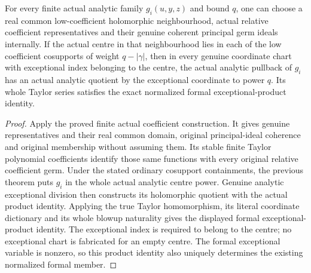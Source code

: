 \begin{theorem}
\label{hir:actual-finite-coefficient-centre-analytic-exceptional-quotients}
\leanok
For every finite actual analytic family $g_i(u,y,z)$ and bound $q$, one
can choose a real common low-coefficient holomorphic neighbourhood, actual
relative coefficient representatives and their genuine coherent principal
germ ideals internally. If the actual centre in that neighbourhood lies
in each of the low coefficient cosupports of weight $q-|\gamma|$, then
in every genuine coordinate chart with exceptional index belonging to
the centre, the actual analytic pullback of $g_i$ has an actual analytic
quotient by the exceptional coordinate to power $q$. Its whole Taylor
series satisfies the exact normalized formal exceptional-product identity.
\end{theorem}
\begin{proof}
Apply the proved finite actual coefficient construction. It gives genuine
representatives and their real common domain, original principal-ideal
coherence and original membership without assuming them. Its stable finite
Taylor polynomial coefficients identify those same functions with every
original relative coefficient germ. Under the stated ordinary cosupport
containments, the previous theorem puts $g_i$ in the whole actual analytic
centre power. Genuine analytic exceptional division then constructs its
holomorphic quotient with the actual product identity. Applying the true
Taylor homomorphism, its literal coordinate dictionary and its whole
blowup naturality gives the displayed formal exceptional-product identity.
The exceptional index is required to belong to the centre; no exceptional
chart is fabricated for an empty centre. The formal exceptional variable
is nonzero, so this product identity also uniquely determines the existing
normalized formal member.
\end{proof}
